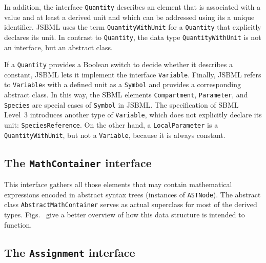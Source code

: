 \documentclass[
  BCOR12mm,
  letterpaper,
  11pt,
  headsepline,
  pointlessnumbers,
  tablecaptionabove,
  onelinecaption,
  headinclude,
  appendixprefix,
  idxtotoc,
  bibtotoc,
  twoside,
  titlepage
]{scrartcl}
\begin{document}
In addition, the interface \texttt{Quantity}
describes an element that is
associated with a value and at least a derived unit and which can be addressed
using its a unique identifier. JSBML uses the term \texttt{QuantityWithUnit} for
a \texttt{Quantity} that explicitly declares its unit. In contrast to
\texttt{Quantity}, the data type \texttt{QuantityWithUnit}
is not an interface, but an abstract class.

If a \texttt{Quantity} provides a Boolean
switch to decide whether it describes a constant,
JSBML lets it implement the interface \texttt{Variable}.
Finally, JSBML refers to \texttt{Variable}s with a defined unit as a
\texttt{Symbol}
and provides a corresponding abstract class. In this way, the
SBML elements \texttt{Compartment}, \texttt{Parameter}, and \texttt{Species}
are special cases of \texttt{Symbol} in JSBML. The specification of SBML Level~3
introduces another type of \texttt{Variable}, which does not explicitly declare
its unit: \texttt{SpeciesReference}. On the other hand, a
\texttt{LocalParameter}
is a \texttt{QuantityWithUnit},
but not a \texttt{Variable}, because it is always constant.


\subsection{The \texttt{MathContainer} interface}

This interface gathers all those elements that may contain mathematical
expressions encoded in abstract syntax trees (instances of
\texttt{ASTNode}).
The abstract class \texttt{AbstractMathContainer} serves as actual superclass
for most of the derived types. Figs.~ give a better overview of how this data structure
is intended to function.


\subsection{The \texttt{Assignment} interface}
\end{document}
